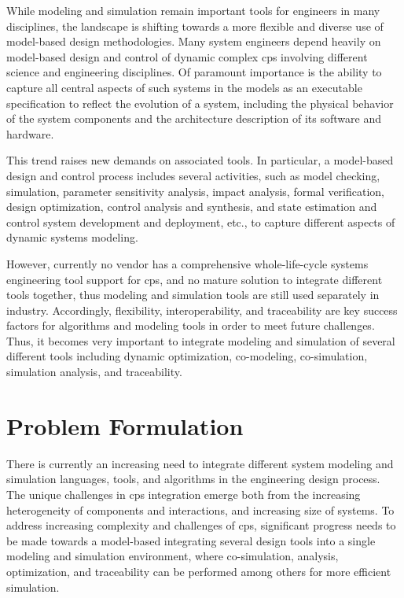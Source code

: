 While modeling and simulation remain important tools for engineers in many disciplines, the landscape is shifting towards a more flexible and diverse use of model-based design methodologies. Many system engineers depend heavily on model-based design and control of dynamic complex \acrshort{cps} involving different science and engineering disciplines. Of paramount importance is the ability to capture all central aspects of such systems in the models as an executable specification to reflect the evolution of a system, including the physical behavior of the system components and the architecture description of its software and hardware. 

This trend raises new demands on associated tools. In particular, a model-based design and control process includes several activities, such as model checking, simulation, parameter sensitivity analysis, impact analysis, formal verification, design optimization, control analysis and synthesis, and state estimation and control system development and deployment, etc., to capture different aspects of dynamic systems modeling.

However, currently no vendor has a comprehensive whole-life-cycle systems engineering tool support for \acrshort{cps}, and no mature solution to integrate different tools together, thus modeling and simulation tools are still used separately in industry. Accordingly, flexibility, interoperability, and traceability are key success factors for algorithms and modeling tools in order to meet future challenges. Thus, it becomes very important to integrate modeling and simulation of several different tools including dynamic optimization, co-modeling, co-simulation, simulation analysis, and traceability.


\section{Problem Formulation}
\label{sec:Problem Formulation}

There is currently an increasing need to integrate different system modeling and simulation languages, tools, and algorithms in the engineering design process. The unique challenges in \acrshort{cps} integration emerge both from the increasing heterogeneity of components and interactions, and increasing size of systems. To address increasing complexity and challenges of \acrshort{cps}, significant progress needs to be made towards a model-based integrating several design tools into a single modeling and simulation environment, where co-simulation, analysis, optimization, and traceability can be performed among others for more efficient simulation.

